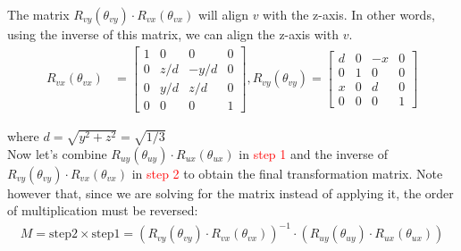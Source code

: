 \documentclass[11pt]{article}  %
\begin{document}
    The matrix $R_{vy}(\theta _{vy}) \cdot R_{vx}(\theta _{vx})$ will align $v$ with the z-axis. In other words, using the inverse of this matrix, we can align the z-axis with $v$.
    \begin{align*}
        R_{vx}(\theta _{vx}) &= \begin{bmatrix}
            1 &   0   &   0   & 0\\
            0 &  z/d  & -y/d  & 0\\
            0 &  y/d  &  z/d  & 0\\
            0 &   0   &   0   & 1
        \end{bmatrix},
        R_{vy}(\theta _{vy}) = \begin{bmatrix}
            d   &   0   &  -x  & 0\\
            0   &   1   &   0  & 0\\
            x   &   0   &   d  & 0\\
            0   &   0   &   0  & 1
        \end{bmatrix}
    \end{align*}
    
    where $d=\sqrt{y^{2} + z^{2}} = \sqrt{1/3}$\\
    
    Now let's combine $R_{uy}(\theta _{uy}) \cdot R_{ux}(\theta _{ux})$ in \textcolor{red}{step 1} and the inverse of $R_{vy}(\theta _{vy}) \cdot R_{vx}(\theta _{vx})$ in \textcolor{red}{step 2} to obtain the final transformation matrix. Note however that, since we are solving for the matrix instead of applying it, the order of multiplication must be reversed:
    \begin{align*}
        M = \text{step2} \times \text{step1} = (R_{vy}(\theta _{vy}) \cdot R_{vx}(\theta _{vx}))^{-1} \cdot (R_{uy}(\theta _{uy}) \cdot R_{ux}(\theta _{ux}))
    \end{align*}
    
\end{document}
